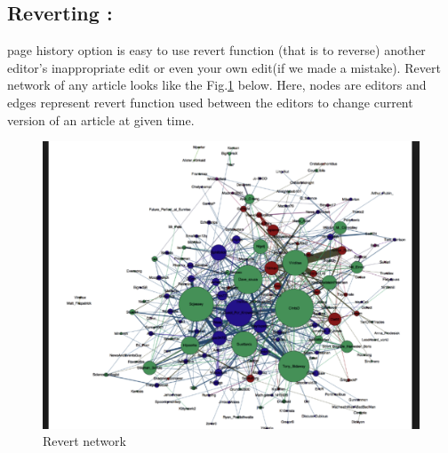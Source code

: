 \documentclass[12pt]{article}
\begin{document}
\subsection*{Reverting :}page history option is easy to use revert function (that is to reverse) another editor's inappropriate edit or even your own edit(if we made a mistake). Revert network of any article looks like the Fig.\ref{Revert} below. Here, nodes are editors and edges represent revert function used between the editors to change current version of an article at given time.
\begin{figure}[h]
\centering
\includegraphics[scale=0.32]{Revert.png}
\caption{Revert network \cite{revert}}
\label{Revert}
\end{figure}
\end{document}
